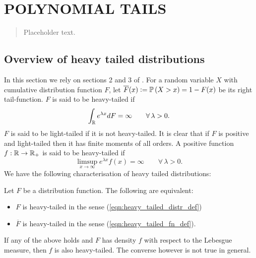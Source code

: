 \section{POLYNOMIAL TAILS}\label{sec:poly}

\begin{quote}
{\small Placeholder text. }
\end{quote}

\subsection{Overview of heavy tailed distributions}\label{sec:heavy_tailed_overview}
In this section we rely on sections 2 and 3 of \cite{foss2011introduction}. For a random variable $X$ with cumulative distribution function $F$, let $\overline{F}(x) \vcentcolon= \mathbb{P} \left( X > x \right) = 1 - F(x)$ be its right tail-function. $F$ is said to be heavy-tailed if 
\begin{equation}\label{eqn:heavy_tailed_distr_def}
\int_{\mathbb{R}} e^{\lambda x} dF = \infty\qquad\forall\, \lambda > 0. 
\end{equation}
$F$ is said to be light-tailed if it is not heavy-tailed. It is clear that if $F$ is positive and light-tailed then it has finite moments of all orders. A positive function $f : \mathbb{R} \to \mathbb{R}_+$ is said to be heavy-tailed if 
\begin{equation}\label{eqn:heavy_tailed_fn_def}
\limsup\limits_{x \to \infty} e^{\lambda x} f(x) = \infty\qquad\forall\,\lambda > 0. 
\end{equation}
We have the following characterisation of heavy tailed distributions:

\begin{theorem}
Let $F$ be a distribution function. The following are equivalent:
\begin{itemize}
\item $F$ is heavy-tailed in the sense (\ref{eqn:heavy_tailed_distr_def})
\item $\overline{F}$ is heavy-tailed in the sense (\ref{eqn:heavy_tailed_fn_def}). 
\end{itemize}
If any of the above holds and $F$ has density $f$ with respect to the Lebesgue measure, then $f$ is also heavy-tailed. The converse however is not true in general. 
\end{theorem}


